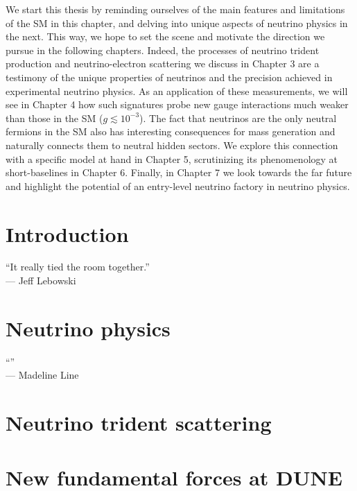 \documentclass[openany,twoside,frontopenright,chaprunninghead]{ip3thesis}
\begin{document}
We start this thesis by reminding ourselves of the main features and limitations of the SM in this chapter, and delving into unique aspects of neutrino physics in the next. This way, we hope to set the scene and motivate the direction we pursue in the following chapters. Indeed, the processes of neutrino trident production and neutrino-electron scattering we discuss in Chapter 3 are a testimony of the unique properties of neutrinos and the precision achieved in experimental neutrino physics. As an application of these measurements, we will see in Chapter 4 how such signatures probe new gauge interactions much weaker than those in the SM ($g \lesssim 10^{-3}$). The fact that neutrinos are the only neutral fermions in the SM also has interesting consequences for mass generation and naturally connects them to neutral hidden sectors. We explore this connection with a specific model at hand in Chapter 5, scrutinizing its phenomenology at short-baselines in Chapter 6. Finally, in Chapter 7 we look towards the far future and highlight the potential of an entry-level neutrino factory in neutrino physics.

\chapter{Introduction}
\begin{flushright}
	``It really tied the room together.''
	\\--- Jeff Lebowski
\end{flushright}


\chapter{Neutrino physics}
\begin{flushright}
	``''
	\\--- Madeline Line
\end{flushright}


\chapter{Neutrino trident scattering}


\chapter{New fundamental forces at DUNE}

\end{document}
